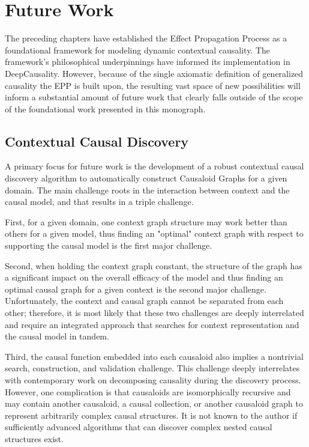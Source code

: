 \section{Future Work}
\label{sec:future_work}

The preceding chapters have established the Effect Propagation Process as a foundational framework for modeling dynamic contextual causality. The framework's philosophical underpinnings have informed its implementation in DeepCausality. However, because of the single axiomatic definition of generalized causality the EPP is built upon, the resulting vast space of new possibilities will inform a substantial amount of future work that clearly falls outside of the scope of the foundational work presented in this monograph. 


\subsection{Contextual Causal Discovery}


A primary focus for future work is the development of a robust contextual causal discovery algorithm to automatically construct Causaloid Graphs for a given domain. The main challenge roots in the interaction between context and the causal model, and that results in a triple challenge.

First, for a given domain, one context graph structure may work better than others for a given model, thus finding an "optimal" context graph with respect to supporting the causal model is the first major challenge. 

 Second, when holding the context graph constant, the structure of the graph has a significant impact on the overall efficacy of the model and thus finding an optimal causal graph for a given context is the second major challenge. Unfortunately,  the context and causal graph cannot be separated from each other; therefore, it is most likely that these two challenges are deeply interrelated and require an integrated approach that searches for context representation and the causal model in tandem.  
 
Third, the causal function embedded into each causaloid also implies a nontrivial search, construction, and validation challenge. This challenge deeply interrelates with contemporary work on decomposing causality during the discovery process. However, one complication is that causaloids are isomorphically recursive and may contain another causaloid, a causal collection, or another causaloid graph to represent arbitrarily complex causal structures. It is not known to the author if sufficiently advanced algorithms that can discover complex nested causal structures exist. 


